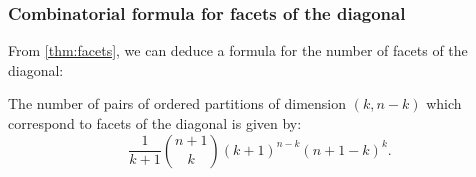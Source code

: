 

\subsubsection{Combinatorial formula for facets of the diagonal}

From \cref{thm:facets}, we can deduce a formula for the number of facets of the diagonal:

\begin{proposition}
The number of pairs of ordered partitions of dimension $(k,n-k)$ which correspond to facets of the diagonal is given by: 
\begin{equation}
\frac{1}{k+1}\binom{n+1}{k}(k+1)^{n-k}(n+1-k)^{k}.
\end{equation}
\end{proposition}

